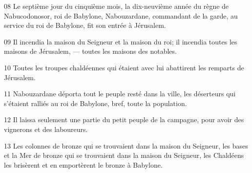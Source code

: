 
08 Le septième jour du cinquième mois, la dix-neuvième année du règne de Nabucodonosor, roi de Babylone, Nabouzardane, commandant de la garde, au service du roi de Babylone, fit son entrée à Jérusalem.

09 Il incendia la maison du Seigneur et la maison du roi; il incendia toutes les maisons de Jérusalem, --- toutes les maisons des notables.

10 Toutes les troupes chaldéennes qui étaient avec lui abattirent les remparts de Jérusalem.

11 Nabouzardane déporta tout le peuple resté dans la ville, les déserteurs qui s’étaient ralliés au roi de Babylone, bref, toute la population.

12 Il laissa seulement une partie du petit peuple de la campagne, pour avoir des vignerons et des laboureurs.

13 Les colonnes de bronze qui se trouvaient dans la maison du Seigneur, les bases et la Mer de bronze qui se trouvaient dans la maison du Seigneur, les Chaldéens les brisèrent et en emportèrent le bronze à Babylone.